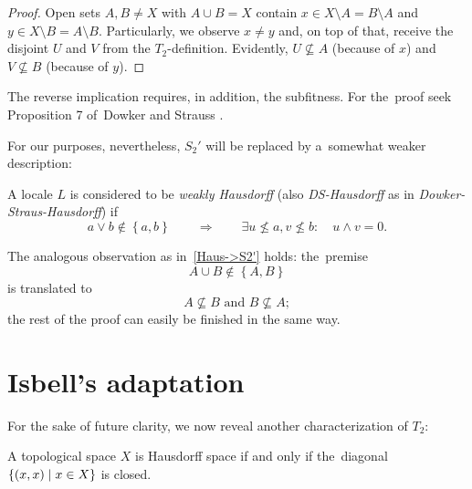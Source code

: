 \begin{proof}
  Open sets $A, B \ne X$ with $A \cup B = X$ contain $x\in X\setminus A =
  B\setminus A$ and $y\in X\setminus B = A\setminus B$.
  Particularly, we observe $x \ne y$ and, on top of that, receive the disjoint
  $U$ and $V$ from the $T_2$-definition.
  Evidently, $U\not\subseteq A$ (because of $x$) and $V\not\subseteq B$
  (because of $y$).
\end{proof}

\begin{rem}
  The reverse implication requires, in addition, the subfitness.
  For the~proof seek Proposition 7 of~Dowker and Strauss
  \cite{ds72}.
\end{rem}

For our purposes, nevertheless, $S_2'$ will be replaced by a~somewhat weaker
description:

\begin{framed}
  \begin{df}[DS-Haus]
    A locale $L$ is considered to be \emph{weakly Hausdorff\/} (also
    \emph{DS-Hausdorff} as in \emph{Dowker-Straus-Hausdorff}) if
    \[
      a \vee b \not\in \left\{a, b\right\} \qquad \Rightarrow \qquad \exists
      u\not\leq a, v\not\leq b: \quad u \wedge v = 0.
    \]
  \end{df}
\end{framed}

\begin{rem} \label{DSHaus->Haus}
  The analogous observation as in~\ref{Haus->S2'} holds:
  the~premise
  \[
    A \cup B \not\in \left\{ A, B \right\}
  \]
  is translated to
  \[
    A \not\subseteq B \textrm{ and } B \not\subseteq A;
  \]
  the rest of the proof can easily be finished in the same way.
\end{rem}

\section{Isbell's adaptation}

For the sake of future clarity, we now reveal another characterization of
$T_2$:

\begin{prop}
  A topological space $X$ is Hausdorff space if and only if the~diagonal
  $\left\{(x, x) \mid x\in X \right\}$ is closed.
\end{prop}

